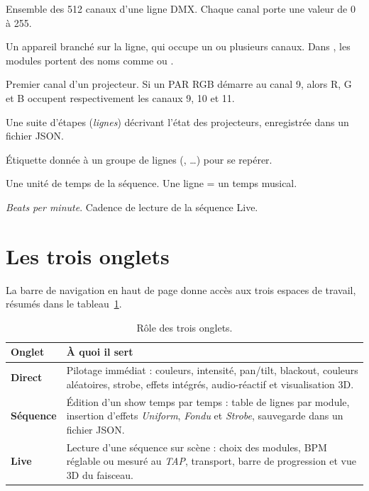 \begin{description}[leftmargin=1.6em,style=nextline]
  \item[Univers (DMX)] Ensemble des 512 canaux d'une ligne DMX. Chaque canal
        porte une valeur de 0 à 255.
  \item[Module / projecteur (\emph{fixture})] Un appareil branché sur la ligne,
        qui occupe un ou plusieurs canaux. Dans \Icare{}, les modules portent des
        noms comme  ou .
  \item[Canal de base] Premier canal d'un projecteur. Si un PAR RGB démarre au
        canal 9, alors R, G et B occupent respectivement les canaux 9, 10 et 11.
  \item[Séquence] Une suite d'étapes (\emph{lignes}) décrivant l'état des
        projecteurs, enregistrée dans un fichier JSON.
  \item[Section] Étiquette donnée à un groupe de lignes (,
        \dots) pour se repérer.
  \item[Beat / ligne] Une unité de temps de la séquence. Une ligne = un temps
        musical.
  \item[BPM] \emph{Beats per minute}. Cadence de lecture de la séquence Live.
\end{description}

\section{Les trois onglets}

La barre de navigation en haut de page donne accès aux trois espaces de travail,
résumés dans le tableau~\ref{tab:onglets}.

\begin{table}[H]
  \centering
  \begin{tabular}{@{}p{2.4cm}p{11.5cm}@{}}
    \toprule
    \textbf{Onglet} & \textbf{À quoi il sert} \\
    \midrule
    \textbf{Direct} & Pilotage immédiat : couleurs, intensité, pan/tilt,
      blackout, couleurs aléatoires, strobe, effets intégrés, audio-réactif et
      visualisation 3D. \\
    \addlinespace
    \textbf{Séquence} & Édition d'un show temps par temps : table de lignes par
      module, insertion d'effets \emph{Uniform}, \emph{Fondu} et \emph{Strobe},
      sauvegarde dans un fichier JSON. \\
    \addlinespace
    \textbf{Live} & Lecture d'une séquence sur scène : choix des modules, BPM
      réglable ou mesuré au \emph{TAP}, transport, barre de progression et vue 3D
      du faisceau. \\
    \bottomrule
  \end{tabular}
  \caption{Rôle des trois onglets.}
  \label{tab:onglets}
\end{table}

